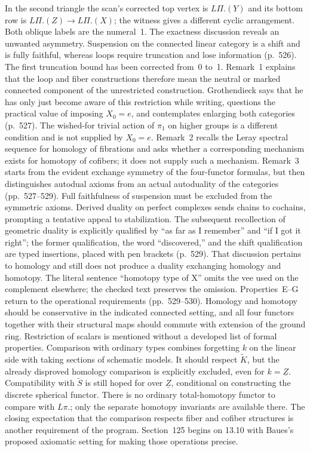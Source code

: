 \documentclass[10pt,oneside]{book}
\begin{document}
In the second triangle the scan's corrected top vertex is $L\Pi.(Y)$ and its bottom row is $L\Pi.(Z)\to L\Pi.(X)$; the witness gives a different cyclic arrangement. Both oblique labels are the numeral~1. The exactness discussion reveals an unwanted asymmetry. Suspension on the connected linear category is a shift and is fully faithful, whereas loops require truncation and lose information (p.~526). The first truncation bound has been corrected from~0 to~1. Remark~1 explains that the loop and fiber constructions therefore mean the neutral or marked connected component of the unrestricted construction. Grothendieck says that he has only just become aware of this restriction while writing, questions the practical value of imposing $X_0=e$, and contemplates enlarging both categories (p.~527). The wished-for trivial action of $\pi_1$ on higher groups is a different condition and is not supplied by $X_0=e$. Remark~2 recalls the Leray spectral sequence for homology of fibrations and asks whether a corresponding mechanism exists for homotopy of cofibers; it does not supply such a mechanism. Remark~3 starts from the evident exchange symmetry of the four-functor formulas, but then distinguishes autodual axioms from an actual autoduality of the categories (pp.~527--529). Full faithfulness of suspension must be excluded from the symmetric axioms. Derived duality on perfect complexes sends chains to cochains, prompting a tentative appeal to stabilization. The subsequent recollection of geometric duality is explicitly qualified by ``as far as I remember'' and ``if I got it right''; the former qualification, the word ``discovered,'' and the shift qualification are typed insertions, placed with pen brackets (p.~529). That discussion pertains to homology and still does not produce a duality exchanging homology and homotopy. The literal sentence ``homotopy type of X'' omits the vee used on the complement elsewhere; the checked text preserves the omission. Properties~E--G return to the operational requirements (pp.~529--530). Homology and homotopy should be conservative in the indicated connected setting, and all four functors together with their structural maps should commute with extension of the ground ring. Restriction of scalars is mentioned without a developed list of formal properties. Comparison with ordinary types combines forgetting $k$ on the linear side with taking sections of schematic models. It should respect $\widetilde K$, but the already disproved homology comparison is explicitly excluded, even for $k=\underline Z$. Compatibility with $\widetilde S$ is still hoped for over $\underline Z$, conditional on constructing the discrete spherical functor. There is no ordinary total-homotopy functor to compare with $L\pi.$; only the separate homotopy invariants are available there. The closing expectation that the comparison respects fiber and cofiber structures is another requirement of the program. Section~125 begins on 13.10 with Baues's proposed axiomatic setting for making those operations precise.
\end{document}
